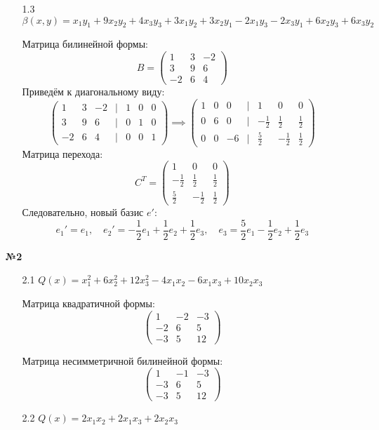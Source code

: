 \documentclass[a4paper]{article}
\newcommand{\mat}[1]{\begin{pmatrix} #1 \end{pmatrix}}
\renewcommand{\f}[2]{\frac{#1}{#2}}
\begin{document}
\begin{enumerate}
\begin{enumerate}
        \item[1.3]$ \beta(x, y) = x_{1} y_{1} + 9 x_{2} y_{2} +
        4 x_{3} y_{3} + 3 x_{1} y_{2} + 3 x_{2} y_{1} - 2 x_{1} y_{3} -
        2 x_{3} y_{1} + 6 x_{2} y_{3} + 6 x_{3} y_{2} $

        Матрица билинейной формы:
        $$B = \mat{1&3&-2\\
        3&9&6\\
        -2&6&4}$$
        Приведём к диагональному виду:
        $$\mat{
            1&3&-2&|&1&0&0\\
            3&9&6&|&0&1&0\\
            -2&6&4&|&0&0&1
        }\implies\mat{
            1&0&0&|&1&0&0\\
            0&6&0&|&-\f{1}{2}&\f{1}{2}&\f{1}{2}\\
            0&0&-6&|&\f{5}{2}&-\f{1}{2}&\f{1}{2}
        }$$
        Матрица перехода:
        $$C^T =\mat{
            1&0&0\\
            -\f{1}{2}&\f{1}{2}&\f{1}{2}\\
            \f{5}{2}&-\f{1}{2}&\f{1}{2}
        }$$
        Следовательно, новый базис $e'$:
        $$e_1' = e_1, \quad e_2' = -\f{1}{2}e_1 + \f{1}{2}e_2 + \f{1}{2}e_3, \quad
        e_3 = \f{5}{2}e_1 - \f{1}{2}e_2 + \f{1}{2}e_3$$

    \end{enumerate}

    \item[\textbf{№2}]\begin{enumerate}
        \item[2.1]$Q(x) = x_1^2+6x_2^2+12x_3^2-4x_1x_2-6x_1x_3+10x_2x_3$
        
        Матрица квадратичной формы:
        $$\begin{pmatrix}
            1 & -2 & -3 \\
            -2 & 6 & 5 \\
            -3 & 5 & 12
            \end{pmatrix}$$

        Матрица несимметричной билинейной формы:
        $$\begin{pmatrix}
            1 & -1 & -3 \\
            -3 & 6 & 5 \\
            -3 & 5 & 12
            \end{pmatrix}$$

        \item[2.2]$ Q(x) = 2x_1x_2 + 2x_1x_3 + 2x_2x_3 $
        

\end{enumerate}
\end{enumerate}
\end{document}
